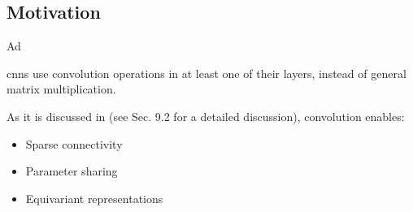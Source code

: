 \subsection{Motivation}
\begin{frame}[t,allowframebreaks]{Ad}

    \glspl{cnn} use  \gls{convolution}
    operations in at least one of their layers, instead of general matrix multiplication.

    As it is discussed in \cite{Goodfellow:2017MITDL} 
    (see Sec. 9.2 for a detailed discussion), \gls{convolution} 
    enables:
    \begin{itemize}
        \item Sparse connectivity
        \item Parameter sharing
        \item Equivariant representations
    \end{itemize}

\end{frame}

